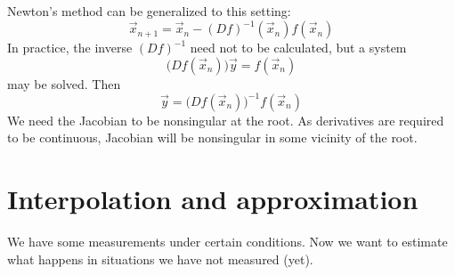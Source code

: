 Newton's method can be generalized to this setting:
\[ \vec{x}_{n + 1} = \vec{x}_n - (Df)^{-1}(\vec{x}_n) f(\vec{x}_n) \]
In practice, the inverse $(Df)^{-1}$ need not to be calculated, but
a system
\[ \bigl(Df(\vec{x}_n)\bigr) \vec{y} = f(\vec{x}_n) \]
may be solved.
Then 
\[ \vec{y} = \bigl(Df(\vec{x}_n)\bigr)^{-1} f(\vec{x}_n) \]
We need the Jacobian to be nonsingular at the root.
As derivatives are required to be continuous, Jacobian will be 
nonsingular in some vicinity of the root.

\pagebreak
\section{Interpolation and approximation}
We have some measurements under certain conditions.
Now we want to estimate what happens in situations we have not measured (yet).
